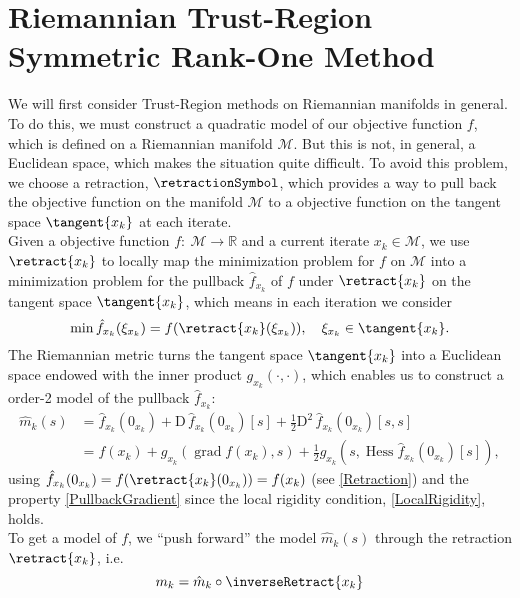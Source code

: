 \section{Riemannian Trust-Region Symmetric Rank-One Method}

We will first consider Trust-Region methods on Riemannian manifolds in general. To do this, we must construct a quadratic model of our objective function $f$, which is defined on a Riemannian manifold $\mathcal{M}$. But this is not, in general, a Euclidean space, which makes the situation quite difficult. To avoid this problem, we choose a retraction, $\retractionSymbol$, which provides a way to pull back the objective function on the manifold $\mathcal{M}$ to a objective function on the tangent space $\tangent{x_k}$ at each iterate. \\
Given a objective function $f \colon \ \mathcal{M} \to \mathbb{R}$ and a current iterate $x_k \in \mathcal{M}$, we use $\retract{x_k}$ to locally map the minimization problem for $f$ on $\mathcal{M}$ into a minimization problem for the pullback $\hat{f}_{x_k}$ of $f$ under $\retract{x_k}$ on the tangent space $\tangent{x_k}$, which means in each iteration we consider 
\begin{equation*}
    \min \hat{f}_{x_k} (\xi_{x_k}) = f(\retract{x_k}(\xi_{x_k})), \quad \xi_{x_k} \in \tangent{x_k}.
\end{equation*}
The Riemannian metric turns the tangent space $\tangent{x_k}$ into a Euclidean space endowed with the inner product $g_{x_k}(\cdot, \cdot)$, which enables us to construct a order-2 model of the pullback $\hat{f}_{x_k}$:
\begin{align*}
    \hat{m}_k( s ) & = \hat{f}_{x_k}(0_{x_k}) + \mathrm{D} \, \hat{f}_{x_k}(0_{x_k}) [s] + \frac{1}{2} \mathrm{D}^2 \, \hat{f}_{x_k}(0_{x_k}) [s, s] \\
    & = f(x_k) + g_{x_k}(\operatorname{grad} f(x_k), s ) + \frac{1}{2} g_{x_k}( s, \operatorname{Hess} \hat{f}_{x_k}(0_{x_k}) [s]),
\end{align*}
using $\hat{f}_{x_k}(0_{x_k}) = f(\retract{x_k}(0_{x_k})) = f(x_k)$ (see \cref{Retraction}) and the property \cref{PullbackGradient} since the local rigidity condition, \cref{LocalRigidity}, holds. \\
To get a model of $f$, we “push forward” the model $\hat{m}_k(s)$ through the retraction $\retract{x_k}$, i.e.
\begin{equation}\label{RiemannianModel}
    m_k = \hat{m}_k \circ \inverseRetract{x_k}
\end{equation}
